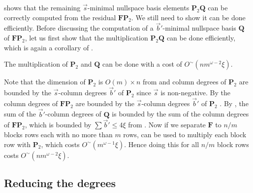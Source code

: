  shows that
the remaining $\vec{s}$-minimal nullspace basis elements $\mathbf{P}_{2}\mathbf{Q}$
can be correctly computed from the residual $\mathbf{F}\mathbf{P}_{2}$.
We still need to show it can be done efficiently. Before discussing
the computation of a $\vec{b}'$-minimal nullspace basis $\mathbf{Q}$
of $\mathbf{F}\mathbf{P}_{2}$, let us first show that the multiplication
$\mathbf{P}_{2}\mathbf{Q}$ can be done efficiently, which is again
a corollary of .
\begin{lem}
\label{cor:multiplyingP2Q}The multiplication of $\mathbf{P}_{2}$
and $\mathbf{Q}$ can be done with a cost of $O^{\sim}\left(nm^{\omega-2}\xi\right)$.\end{lem}
\begin{pf}
Note that the dimension of $\mathbf{P}_{2}$ is $O(m)\times n$ from
and column
degrees of $\mathbf{P}_{2}$ are bounded by the $\vec{s}$-column
degrees $\vec{b}'$ of $\mathbf{P}_{2}$ since $\vec{s}$ is non-negative.
By  the column degrees of $\mathbf{F}\mathbf{P}_{2}$
are bounded by the $\vec{s}$-column degrees $\vec{b}'$ of $\mathbf{P}_{2}$
. By ,
the sum of the $\vec{b}'$-column degrees of $\mathbf{Q}$ is bounded
by the sum of the column degrees of $\mathbf{F}\mathbf{P}_{2}$, which
is bounded by $\sum\vec{b}'\le4\xi$ from .
Now if we separate $\mathbf{F}$ to $n/m$ blocks rows each with no
more than $m$ rows,  can
be used to multiply each block row with $\mathbf{P}_{2}$, which costs
$O^{\sim}(m^{\omega-1}\xi)$. Hence doing this for all $n/m$ block
rows costs $O^{\sim}\left(nm^{\omega-2}\xi\right)$.
\end{pf}

\subsection{Reducing the degrees}

